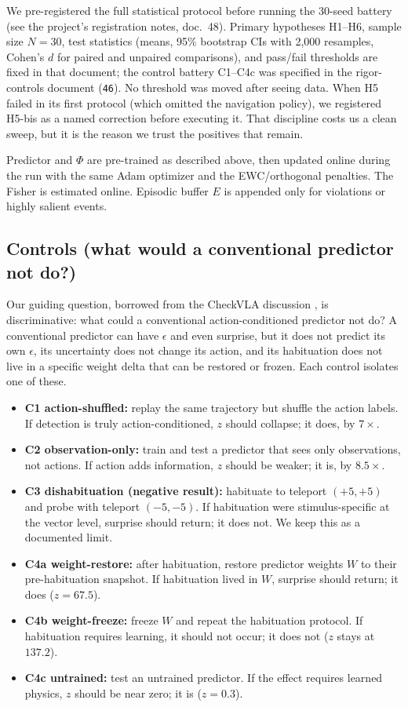 \documentclass[11pt,a4paper]{article}
\begin{document}
We pre-registered the full statistical protocol before running the 30-seed battery (see the project's registration notes, doc.~48). Primary hypotheses H1--H6, sample size $N=30$, test statistics (means, 95\% bootstrap CIs with 2,000 resamples, Cohen's $d$ for paired and unpaired comparisons), and pass/fail thresholds are fixed in that document; the control battery C1--C4c was specified in the rigor-controls document (\texttt{46}). No threshold was moved after seeing data. When H5 failed in its first protocol (which omitted the navigation policy), we registered H5-bis as a named correction before executing it. That discipline costs us a clean sweep, but it is the reason we trust the positives that remain.

Predictor and $\Phi$ are pre-trained as described above, then updated online during the run with the same Adam optimizer and the EWC/orthogonal penalties. The Fisher is estimated online. Episodic buffer $E$ is appended only for violations or highly salient events.

\subsection{Controls (what would a conventional predictor not do?)}

Our guiding question, borrowed from the CheckVLA discussion \cite{checkvla2026}, is discriminative: what could a conventional action-conditioned predictor not do? A conventional predictor can have $\epsilon$ and even surprise, but it does not predict its own $\epsilon$, its uncertainty does not change its action, and its habituation does not live in a specific weight delta that can be restored or frozen. Each control isolates one of these.

\begin{itemize}[leftmargin=1.2em]
    \item \textbf{C1 action-shuffled:} replay the same trajectory but shuffle the action labels. If detection is truly action-conditioned, $z$ should collapse; it does, by $7\times$.
    \item \textbf{C2 observation-only:} train and test a predictor that sees only observations, not actions. If action adds information, $z$ should be weaker; it is, by $8.5\times$.
    \item \textbf{C3 dishabituation (negative result):} habituate to teleport $(+5,+5)$ and probe with teleport $(-5,-5)$. If habituation were stimulus-specific at the vector level, surprise should return; it does not. We keep this as a documented limit.
    \item \textbf{C4a weight-restore:} after habituation, restore predictor weights $W$ to their pre-habituation snapshot. If habituation lived in $W$, surprise should return; it does ($z=67.5$).
    \item \textbf{C4b weight-freeze:} freeze $W$ and repeat the habituation protocol. If habituation requires learning, it should not occur; it does not ($z$ stays at $137.2$).
    \item \textbf{C4c untrained:} test an untrained predictor. If the effect requires learned physics, $z$ should be near zero; it is ($z=0.3$).
\end{itemize}
\end{document}
